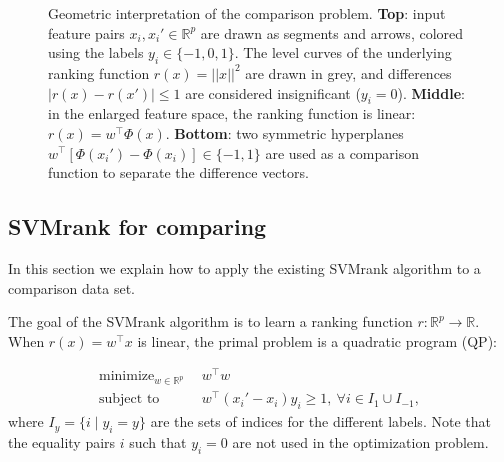 \documentclass{article}
\newcommand{\RR}{\mathbb R}
\DeclareMathOperator*{\minimize}{minimize}
\begin{document}
\begin{figure}
  \centering
  
  \vskip -0.5cm
  \caption{Geometric interpretation of the comparison
    problem. \textbf{Top}: input feature pairs $x_i,x_i'\in\RR^p$ are
    drawn as segments and arrows, colored using the labels
    $y_i\in\{-1,0,1\}$. The level curves of the underlying ranking
    function $r(x)=||x||^2$ are drawn in grey, and differences
    $|r(x)-r(x')|\leq 1$ are considered insignificant
    ($y_i=0$). \textbf{Middle}: in the enlarged feature space, the
    ranking function is linear: $r(x)=w^\intercal
    \Phi(x)$. \textbf{Bottom}: two symmetric hyperplanes
    $w^\intercal[\Phi(x_i')-\Phi(x_i)]\in\{-1,1\}$ are used as a
    comparison function to separate the difference vectors.}
  \label{fig:geometry}
\end{figure}

\subsection{SVMrank for comparing}

In this section we explain how to apply the existing SVMrank algorithm
to a comparison data set.

The goal of the SVMrank algorithm is to learn a ranking function
$r:\RR^p \rightarrow \RR$. When $r(x)=w^\intercal x$ is linear, the
primal problem is a quadratic program (QP):

\begin{equation}
  \begin{aligned}
    \minimize_{w\in\RR^p}\ \  & w^\intercal w \\
    \text{subject to}\ \  & w^\intercal(x_i'-x_i)y_i \geq 1,
    \ \forall i\in I_1\cup I_{-1},
  \end{aligned}
  \label{eq:svmrank}
\end{equation}
where $I_y=\{i\mid y_i=y\}$ are the sets of indices for the different
labels. Note that the equality pairs $i$ such that $y_i=0$ are not
used in the optimization problem.
\end{document}

